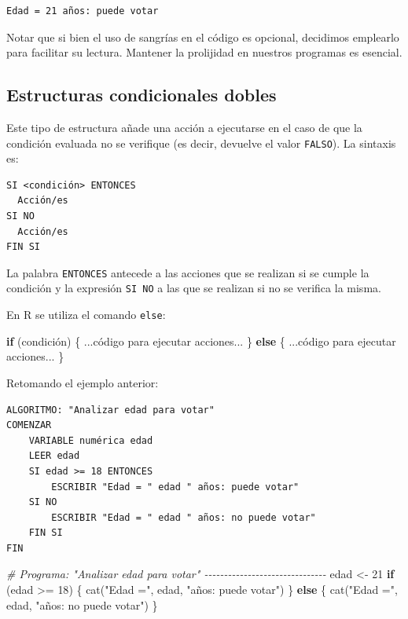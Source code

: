 \documentclass[
]{book}
\newenvironment{Shaded}{\begin{snugshade}}{\end{snugshade}}
\newcommand{\CommentTok}[1]{\textcolor[rgb]{0.56,0.35,0.01}{\textit{#1}}}
\newcommand{\ControlFlowTok}[1]{\textcolor[rgb]{0.13,0.29,0.53}{\textbf{#1}}}
\newcommand{\DecValTok}[1]{\textcolor[rgb]{0.00,0.00,0.81}{#1}}
\newcommand{\FunctionTok}[1]{\textcolor[rgb]{0.00,0.00,0.00}{#1}}
\newcommand{\NormalTok}[1]{#1}
\newcommand{\OtherTok}[1]{\textcolor[rgb]{0.56,0.35,0.01}{#1}}
\newcommand{\SpecialCharTok}[1]{\textcolor[rgb]{0.00,0.00,0.00}{#1}}
\newcommand{\StringTok}[1]{\textcolor[rgb]{0.31,0.60,0.02}{#1}}
\begin{document}
\begin{verbatim}
Edad = 21 años: puede votar
\end{verbatim}

Notar que si bien el uso de sangrías en el código es opcional, decidimos emplearlo para facilitar su lectura. Mantener la prolijidad en nuestros programas es esencial.

\hypertarget{estructuras-condicionales-dobles}{%
\subsection{Estructuras condicionales dobles}\label{estructuras-condicionales-dobles}}

Este tipo de estructura añade una acción a ejecutarse en el caso de que la condición evaluada no se verifique (es decir, devuelve el valor \texttt{FALSO}). La sintaxis es:

\begin{verbatim}
SI <condición> ENTONCES
  Acción/es
SI NO
  Acción/es
FIN SI
\end{verbatim}

La palabra \texttt{ENTONCES} antecede a las acciones que se realizan si se cumple la condición y la expresión \texttt{SI\ NO} a las que se realizan si no se verifica la misma.

En R se utiliza el comando \texttt{else}:

\begin{Shaded}
\begin{Highlighting}[]
\ControlFlowTok{if}\NormalTok{ (condición) \{}
\NormalTok{    ...código para ejecutar acciones...}
\NormalTok{\} }\ControlFlowTok{else}\NormalTok{ \{}
\NormalTok{    ...código para ejecutar acciones...}
\NormalTok{\}}
\end{Highlighting}
\end{Shaded}

Retomando el ejemplo anterior:

\begin{verbatim}
ALGORITMO: "Analizar edad para votar"
COMENZAR
    VARIABLE numérica edad
    LEER edad
    SI edad >= 18 ENTONCES
        ESCRIBIR "Edad = " edad " años: puede votar"
    SI NO
        ESCRIBIR "Edad = " edad " años: no puede votar"
    FIN SI
FIN
\end{verbatim}

\begin{Shaded}
\begin{Highlighting}[]
\CommentTok{\# Programa: "Analizar edad para votar" {-}{-}{-}{-}{-}{-}{-}{-}{-}{-}{-}{-}{-}{-}{-}{-}{-}{-}{-}{-}{-}{-}{-}{-}{-}{-}{-}{-}{-}{-}{-}}
\NormalTok{edad }\OtherTok{\textless{}{-}} \DecValTok{21}
\ControlFlowTok{if}\NormalTok{ (edad }\SpecialCharTok{\textgreater{}=} \DecValTok{18}\NormalTok{) \{}
    \FunctionTok{cat}\NormalTok{(}\StringTok{"Edad ="}\NormalTok{, edad, }\StringTok{"años: puede votar"}\NormalTok{)}
\NormalTok{\} }\ControlFlowTok{else}\NormalTok{ \{}
    \FunctionTok{cat}\NormalTok{(}\StringTok{"Edad ="}\NormalTok{, edad, }\StringTok{"años: no puede votar"}\NormalTok{)}
\NormalTok{\}}
\end{Highlighting}
\end{Shaded}
\end{document}
